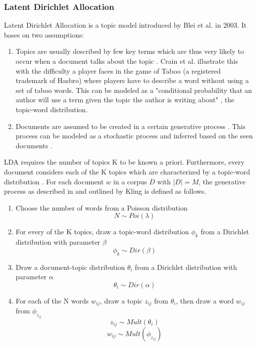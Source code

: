 \subsubsection{Latent Dirichlet Allocation}
\label{LDA}
Latent Dirichlet Allocation is a topic model introduced by Blei et al. \cite{DBLP:journals/jmlr/BleiNJ03} in 2003. It bases on two assumptions:
\begin{enumerate}
\item Topics are usually described by few key terms which are thus very likely to occur when a document talks about the topic \cite{Crain2012}. Crain et al. \cite{Crain2012} illustrate this with the difficulty a player faces in the game of Taboo\textsuperscript{\textregistered} (a registered trademark of Hasbro) where players have to describe a word without using a set of taboo words. This can be modeled as a "conditional probability that an author will use a term given the topic the author is writing about" \cite{Crain2012}, the topic-word distribution.
\item Documents are assumed to be created in a certain generative process \cite{Blei:2012:PTM:2133806.2133826, DBLP:conf/icml/Wallach06}. This process can be modeled as a stochastic process and inferred based on the seen documents \cite{Blei:2012:PTM:2133806.2133826}.
\end{enumerate}
LDA requires the number of topics K to be known a priori. Furthermore, every document considers each of the K topics \cite{Blei:2012:PTM:2133806.2133826} which are characterized by a topic-word distribution \cite{wallach08}.
For each document $w$ in a corpus $D$ with $|D| = M$, the generative process as described in \cite{DBLP:journals/jmlr/BleiNJ03} and outlined by Kling \cite{DBLP:phd/dnb/Kling16} is defined as follows.
\begin{enumerate}
\item Choose the number of words from a Poisson distribution 
\begin{equation}
N \sim Poi(\lambda)
\end{equation}
\item For every of the K topics, draw a topic-word distribution $\phi_k$ from a Dirichlet distribution with parameter $\beta$
\begin{equation}
\phi_k \sim Dir(\beta)
\end{equation}
\item Draw a document-topic distribution $\theta_i$ from a Dirichlet distribution with parameter $\alpha$
\begin{equation} 
\theta_i \sim Dir(\alpha)
\end{equation}
\item For each of the N words $w_{ij}$, draw a topic $z_{ij}$ from $\theta_i$, then draw a word $w_{ij}$ from $\phi_{z_{ij}}$
\begin{equation}
z_{ij} \sim Mult(\theta_i)
\end{equation}
\begin{equation}
w_{ij} \sim Mult(\phi_{z_{ij}})
\end{equation}
\end{enumerate}
